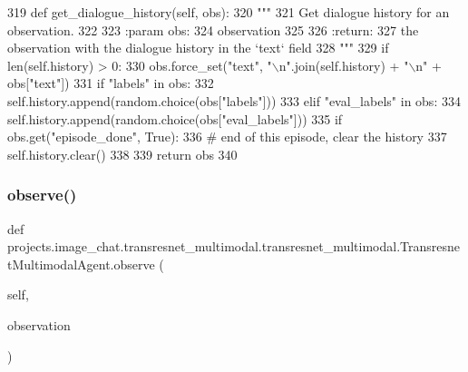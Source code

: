 \begin{DoxyCode}
319     \textcolor{keyword}{def }get\_dialogue\_history(self, obs):
320         \textcolor{stringliteral}{"""}
321 \textcolor{stringliteral}{        Get dialogue history for an observation.}
322 \textcolor{stringliteral}{}
323 \textcolor{stringliteral}{        :param obs:}
324 \textcolor{stringliteral}{            observation}
325 \textcolor{stringliteral}{}
326 \textcolor{stringliteral}{        :return:}
327 \textcolor{stringliteral}{            the observation with the dialogue history in the `text` field}
328 \textcolor{stringliteral}{        """}
329         \textcolor{keywordflow}{if} len(self.history) > 0:
330             obs.force\_set(\textcolor{stringliteral}{"text"}, \textcolor{stringliteral}{"\(\backslash\)n"}.join(self.history) + \textcolor{stringliteral}{"\(\backslash\)n"} + obs[\textcolor{stringliteral}{"text"}])
331         \textcolor{keywordflow}{if} \textcolor{stringliteral}{"labels"} \textcolor{keywordflow}{in} obs:
332             self.history.append(random.choice(obs[\textcolor{stringliteral}{"labels"}]))
333         \textcolor{keywordflow}{elif} \textcolor{stringliteral}{"eval\_labels"} \textcolor{keywordflow}{in} obs:
334             self.history.append(random.choice(obs[\textcolor{stringliteral}{"eval\_labels"}]))
335         \textcolor{keywordflow}{if} obs.get(\textcolor{stringliteral}{"episode\_done"}, \textcolor{keyword}{True}):
336             \textcolor{comment}{# end of this episode, clear the history}
337             self.history.clear()
338 
339         \textcolor{keywordflow}{return} obs
340 
\end{DoxyCode}
\mbox{\label{classprojects_1_1image__chat_1_1transresnet__multimodal_1_1transresnet__multimodal_1_1TransresnetMultimodalAgent_a8bb118477544ab35e45194dc1f08f4ce}} 
\subsubsection{\texorpdfstring{observe()}{observe()}}
{\footnotesize\ttfamily def projects.\+image\+\_\+chat.\+transresnet\+\_\+multimodal.\+transresnet\+\_\+multimodal.\+Transresnet\+Multimodal\+Agent.\+observe (\begin{DoxyParamCaption}\item[{}]{self,  }\item[{}]{observation }\end{DoxyParamCaption})}

